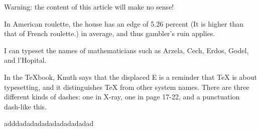Warning: the content of this article will make no sense!

In American roulette, the house has an edge of 5.26 percent
(It is higher than that of French roulette.) in average,
and thus gambler's ruin applies.

I can typeset the names of mathematicians such as Arzela, Cech, Erdos,
Godel, and l'Hopital.

In the TeXbook, Knuth says that the displaced E is a reminder that TeX
is about typesetting, and it distinguishes TeX from other system names.
There are three different kinds of dashes: one in X-ray, one in page 17-22,
and a punctuation dash-like this.

adddadadadadadadadadadad